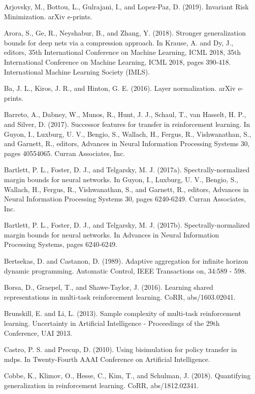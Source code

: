 \documentclass[10pt]{article}
\begin{document}
Arjovsky, M., Bottou, L., Gulrajani, I., and Lopez-Paz, D. (2019). Invariant Risk Minimization. arXiv e-prints.

Arora, S., Ge, R., Neyshabur, B., and Zhang, Y. (2018). Stronger generalization bounds for deep nets via a compression approach. In Krause, A. and Dy, J., editors, 35th International Conference on Machine Learning, ICML 2018, 35th International Conference on Machine Learning, ICML 2018, pages 390-418. International Machine Learning Society (IMLS).

Ba, J. L., Kiros, J. R., and Hinton, G. E. (2016). Layer normalization. arXiv e-prints.

Barreto, A., Dabney, W., Munos, R., Hunt, J. J., Schaul, T., van Hasselt, H. P., and Silver, D. (2017). Successor features for transfer in reinforcement learning. In Guyon, I., Luxburg, U. V., Bengio, S., Wallach, H., Fergus, R., Vishwanathan, S., and Garnett, R., editors, Advances in Neural Information Processing Systems 30, pages 40554065. Curran Associates, Inc.

Bartlett, P. L., Foster, D. J., and Telgarsky, M. J. (2017a). Spectrally-normalized margin bounds for neural networks. In Guyon, I., Luxburg, U. V., Bengio, S., Wallach, H., Fergus, R., Vishwanathan, S., and Garnett, R., editors, Advances in Neural Information Processing Systems 30, pages 6240-6249. Curran Associates, Inc.

Bartlett, P. L., Foster, D. J., and Telgarsky, M. J. (2017b). Spectrally-normalized margin bounds for neural networks. In Advances in Neural Information Processing Systems, pages 6240-6249.

Bertsekas, D. and Castanon, D. (1989). Adaptive aggregation for infinite horizon dynamic programming. Automatic Control, IEEE Transactions on, 34:589 - 598.

Borsa, D., Graepel, T., and Shawe-Taylor, J. (2016). Learning shared representations in multi-task reinforcement learning. CoRR, abs/1603.02041.

Brunskill, E. and Li, L. (2013). Sample complexity of multi-task reinforcement learning. Uncertainty in Artificial Intelligence - Proceedings of the 29th Conference, UAI 2013.

Castro, P. S. and Precup, D. (2010). Using bisimulation for policy transfer in mdps. In Twenty-Fourth AAAI Conference on Artificial Intelligence.

Cobbe, K., Klimov, O., Hesse, C., Kim, T., and Schulman, J. (2018). Quantifying generalization in reinforcement learning. CoRR, abs/1812.02341.
\end{document}
